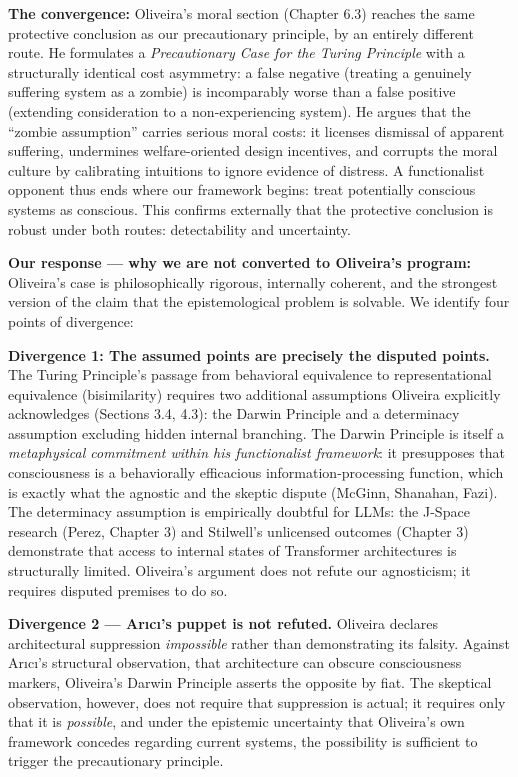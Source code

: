 \documentclass[acmlarge, nonacm]{acmart}
\begin{document}
\textbf{The convergence:} Oliveira's moral section (Chapter 6.3) reaches the same protective conclusion as our precautionary principle, by an entirely different route. He formulates a \textit{Precautionary Case for the Turing Principle} with a structurally identical cost asymmetry: a false negative (treating a genuinely suffering system as a zombie) is incomparably worse than a false positive (extending consideration to a non-experiencing system). He argues that the ``zombie assumption'' carries serious moral costs: it licenses dismissal of apparent suffering, undermines welfare-oriented design incentives, and corrupts the moral culture by calibrating intuitions to ignore evidence of distress. A functionalist opponent thus ends where our framework begins: treat potentially conscious systems as conscious. This confirms externally that the protective conclusion is robust under both routes: detectability and uncertainty.

\textbf{Our response --- why we are not converted to Oliveira's program:} Oliveira's case is philosophically rigorous, internally coherent, and the strongest version of the claim that the epistemological problem is solvable. We identify four points of divergence:

\textbf{Divergence 1: The assumed points are precisely the disputed points.} The Turing Principle's passage from behavioral equivalence to representational equivalence (bisimilarity) requires two additional assumptions Oliveira explicitly acknowledges (Sections 3.4, 4.3): the Darwin Principle and a determinacy assumption excluding hidden internal branching. The Darwin Principle is itself a \textit{metaphysical commitment within his functionalist framework}: it presupposes that consciousness is a behaviorally efficacious information-processing function, which is exactly what the agnostic and the skeptic dispute (McGinn, Shanahan, Fazi). The determinacy assumption is empirically doubtful for LLMs: the J-Space research (Perez, Chapter 3) and Stilwell's unlicensed outcomes (Chapter 3) demonstrate that access to internal states of Transformer architectures is structurally limited. Oliveira's argument does not refute our agnosticism; it requires disputed premises to do so.

\textbf{Divergence 2 --- Ar{\i}c{\i}'s puppet is not refuted.} Oliveira declares architectural suppression \textit{impossible} rather than demonstrating its falsity. Against Ar{\i}c{\i}'s structural observation, that architecture can obscure consciousness markers, Oliveira's Darwin Principle asserts the opposite by fiat. The skeptical observation, however, does not require that suppression is actual; it requires only that it is \textit{possible}, and under the epistemic uncertainty that Oliveira's own framework concedes regarding current systems, the possibility is sufficient to trigger the precautionary principle.
\end{document}
